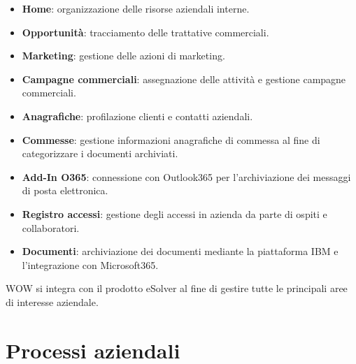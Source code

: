 \begin{itemize}
    \item \textbf{Home}: organizzazione delle risorse aziendali interne. 
    \item \textbf{Opportunità}: tracciamento delle trattative commerciali. 
    \item \textbf{Marketing}: gestione delle azioni di marketing. 
    \item \textbf{Campagne commerciali}: assegnazione delle attività e gestione campagne commerciali.
    \item \textbf{Anagrafiche}: profilazione clienti e contatti aziendali. 
    \item \textbf{Commesse}: gestione informazioni anagrafiche di commessa al fine di categorizzare i documenti archiviati.
    \item \textbf{Add-In O365}: connessione con Outlook365 per l'archiviazione dei messaggi di posta elettronica.
    \item \textbf{Registro accessi}: gestione degli accessi in azienda da parte di ospiti e collaboratori.
    \item \textbf{Documenti}: archiviazione dei documenti mediante la piattaforma IBM e l'integrazione con Microsoft365.\\
\end{itemize}
WOW si integra con il prodotto eSolver al fine di gestire tutte le principali aree di interesse aziendale. 

\section{Processi aziendali}
